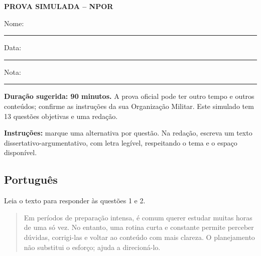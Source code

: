 \documentclass[12pt,a4paper]{article}
\begin{document}
\begin{center}
  {\Large\bfseries PROVA SIMULADA -- NPOR}\par
  \vspace{0.4cm}
  Nome: \rule{9cm}{0.4pt}\par\vspace{0.3cm}
  Data: \rule{4cm}{0.4pt}\hfill Nota: \rule{3cm}{0.4pt}
\end{center}

\noindent\textbf{Duração sugerida: 90 minutos.} A prova oficial pode ter outro tempo e outros conteúdos; confirme as instruções da sua Organização Militar. Este simulado tem 13 questões objetivas e uma redação.

\medskip
\noindent\textbf{Instruções:} marque uma alternativa por questão. Na redação, escreva um texto dissertativo-argumentativo, com letra legível, respeitando o tema e o espaço disponível.

\subsection*{Português}
Leia o texto para responder às questões 1 e 2.

\begin{quote}
Em períodos de preparação intensa, é comum querer estudar muitas horas de uma só vez. No entanto, uma rotina curta e constante permite perceber dúvidas, corrigi-las e voltar ao conteúdo com mais clareza. O planejamento não substitui o esforço; ajuda a direcioná-lo.
\end{quote}
\end{document}
